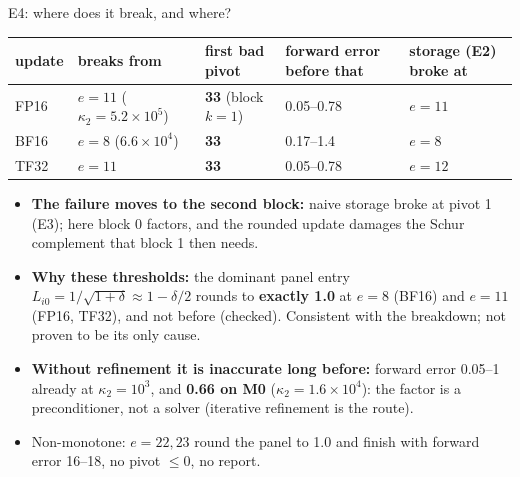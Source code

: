 \documentclass[aspectratio=169,10pt,xcolor=table]{beamer}
\begin{document}
\begin{frame}{E4: where does it break, and where?}
\scriptsize
\begin{tabular}{lllll}
\toprule
update & breaks from & first bad pivot & forward error before that & storage (E2) broke at\\
\midrule
FP16 & $e=11$ ($\kappa_2=5.2\times10^{5}$) & \textbf{33} (block $k=1$) & 0.05--0.78 & $e=11$\\
BF16 & $e=8$ ($6.6\times10^{4}$) & \textbf{33} & 0.17--1.4 & $e=8$\\
TF32 & $e=11$ & \textbf{33} & 0.05--0.78 & $e=12$\\
\bottomrule
\end{tabular}

\vspace{3mm}\footnotesize
\begin{itemize}
\item \textbf{The failure moves to the second block:} naive storage broke at pivot 1 (E3); here block 0 factors, and the rounded update damages the Schur complement that block 1 then needs.
\item \textbf{Why these thresholds:} the dominant panel entry $L_{i0}=1/\sqrt{1+\delta}\approx1-\delta/2$ rounds to \textbf{exactly 1.0} at $e=8$ (BF16) and $e=11$ (FP16, TF32), and not before (checked). Consistent with the breakdown; not proven to be its only cause.
\item \textbf{Without refinement it is inaccurate long before:} forward error 0.05--1 already at $\kappa_2=10^{3}$, and \textbf{0.66 on M0} ($\kappa_2=1.6\times10^{4}$): the factor is a preconditioner, not a solver (iterative refinement is the route).
\item Non-monotone: $e=22,23$ round the panel to 1.0 and finish with forward error 16--18, no pivot $\le0$, no report.
\end{itemize}
\end{frame}
\end{document}
